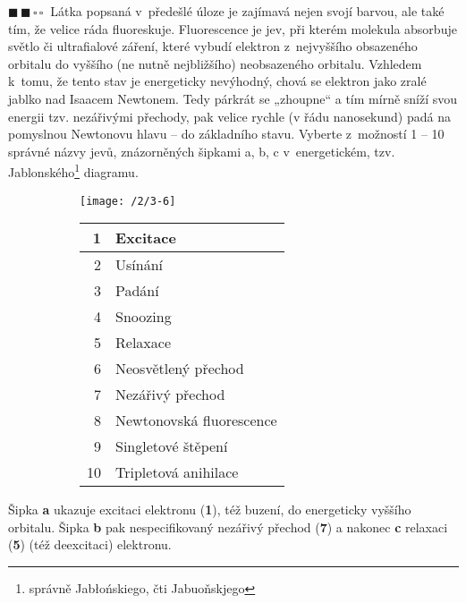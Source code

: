 \documentclass{book}
\newcommand{\dva}{$\blacksquare \, \blacksquare \, \square \, \square \; \; $}
\renewenvironment{quotation}{\par}{\par} %
\begin{document}
\hrulefill %
\begin{quotation}
\dva Látka popsaná v~předešlé úloze je zajímavá nejen svojí barvou, ale také
tím, že velice ráda fluoreskuje. Fluorescence
je jev, při kterém molekula absorbuje světlo či ultrafialové záření, které vybudí
elektron z~nejvyššího obsazeného orbitalu do vyššího (ne nutně nejbližšího)
neobsazeného orbitalu. Vzhledem k~tomu, že tento stav je energeticky
nevýhodný, chová se elektron jako zralé jablko nad Isaacem Newtonem.
Tedy párkrát se „zhoupne“ a tím mírně sníží svou energii tzv. nezářivými
přechody, pak velice rychle (v řádu nanosekund) padá na pomyslnou
Newtonovu hlavu -- do základního stavu. Vyberte z~možností 1 --
10 správné názvy jevů, znázorněných šipkami a, b, c v~energetickém,
tzv. Jablonského\footnote{správně Jabłońskiego, čti Jabuoňskjego} diagramu.

\begin{figure}[ht]
\begin{subfigure}{.6\textwidth}
\centering
\texttt{[image: /2/3-6]}
\label{fig:subim1}
\end{subfigure}
\begin{subfigure}{.4\textwidth}
\begin{tabular}{r|l} 
 
 1 & Excitace\\ 
 \hline
 2 & Usínání\\
 \hline
 3 & Padání\\
 \hline
 4 & Snoozing\\
 \hline
 5 & Relaxace\\
 \hline
 6 & Neosvětlený přechod\\
 \hline
 7 & Nezářivý přechod\\
 \hline
 8 & Newtonovská fluorescence\\
 \hline
 9 & Singletové štěpení\\
 \hline
 10 & Tripletová anihilace\\
\end{tabular}
\label{fig:subim2}
\end{subfigure}
\end{figure}
\end{quotation} \dotfill \par 
Šipka \textbf{a} ukazuje excitaci elektronu (\textbf{1}), též buzení, do energeticky vyššího orbitalu. Šipka \textbf{b} pak nespecifikovaný nezářivý přechod (\textbf{7}) a nakonec \textbf{c} relaxaci (\textbf{5}) (též deexcitaci) elektronu.
\end{document}
